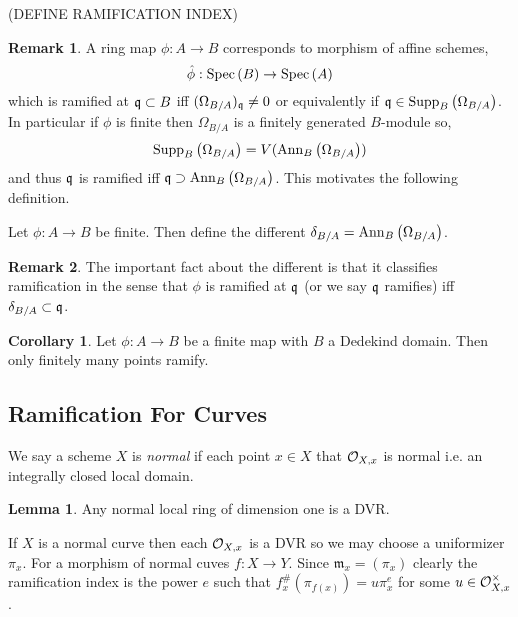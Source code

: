 \documentclass[12pt]{extarticle}
\theoremstyle{definition}
\newtheorem{lemma}[theorem]{Lemma}
\newtheorem{corollary}[theorem]{Corollary}
\newtheorem{remark}{Remark}
\newenvironment{definition}[1][Definition:]{\begin{trivlist}
\item[\hskip \labelsep {\bfseries #1}]}{\end{trivlist}}
\newcommand{\m}{\mathfrak{m}}
\begin{document}
(DEFINE RAMIFICATION INDEX)

\begin{remark}
A ring map $\phi : A \to B$ corresponds to morphism of affine schemes,
\[ \hat{\phi} : \mathrm{Spec}\left(B\right) \to \mathrm{Spec}\left(A\right) \]
which is ramified at $\mathfrak{q} \subset B$ iff $(\Omega_{B / A})_{\mathfrak{q}} \neq 0$ or equivalently if $\mathfrak{q} \in \mathrm{Supp}_{B}\left( \Omega_{B / A} \right)$. 
\bigskip\\
In particular if $\phi$ is finite then $\Omega_{B / A}$ is a finitely generated $B$-module so,
\[ \mathrm{Supp}_{B}\left( \Omega_{B / A} \right) = V(\mathrm{Ann}_{B}\left( \Omega_{B/A} \right)) \]
and thus $\mathfrak{q}$ is ramified iff $\mathfrak{q} \supset \mathrm{Ann}_{B}\left( \Omega_{B/A} \right)$. This motivates the following definition. 
\end{remark}

\begin{definition}
Let $\phi : A \to B$ be finite. Then define the different $\delta_{B/A} = \mathrm{Ann}_{B}\left( \Omega_{B/A} \right)$. 
\end{definition}

\begin{remark}
The important fact about the different is that it classifies ramification in the sense that $\phi$ is ramified at $\mathfrak{q}$ (or we say $\mathfrak{q}$ ramifies) iff $\delta_{B/A} \subset \mathfrak{q}$. 
\end{remark}

\begin{corollary}
Let $\phi : A \to B$ be a finite map with $B$ a Dedekind domain. Then only finitely many points ramify.
\end{corollary}


\subsection{Ramification For Curves}

\begin{definition}
We say a scheme $X$ is \textit{normal} if each point $x \in X$ that $\mathcal{O}_{X, x}$ is normal i.e. an integrally closed local domain. 
\end{definition}

\begin{lemma}
Any normal local ring of dimension one is a DVR.
\end{lemma}

\begin{definition}
If $X$ is a normal curve then each $\mathcal{O}_{X, x}$ is a DVR so we may choose a uniformizer $\pi_x$. For a morphism of normal cuves $f : X \to Y$. Since $\m_x = (\pi_x)$ clearly the ramification index is the power $e$ such that $f^\#_{x}(\pi_{f(x)}) = u \pi_x^e$ for some $u \in \mathcal{O}_{X, x}^\times$. 
\end{definition}
\end{document}

